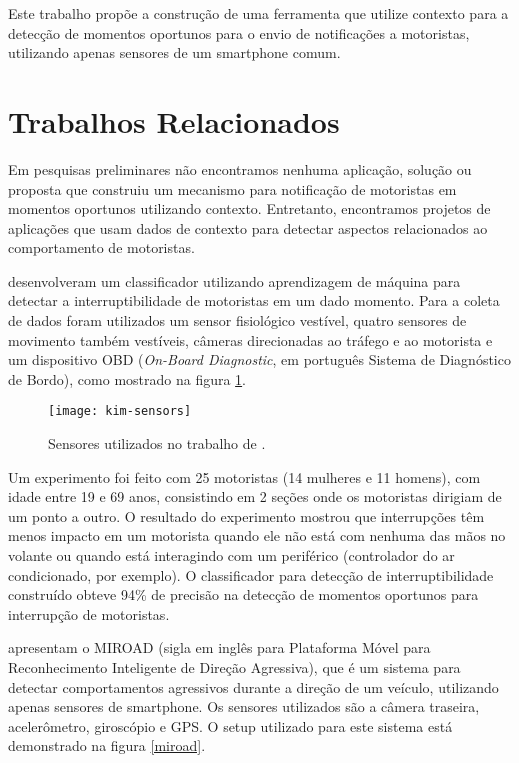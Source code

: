 Este trabalho propõe a construção de uma ferramenta que utilize contexto para a detecção de momentos oportunos para
o envio de notificações a motoristas, utilizando apenas sensores de um smartphone comum.

\section{Trabalhos Relacionados}
\label{trabalhos-relacionados}

Em pesquisas preliminares não encontramos nenhuma aplicação, solução ou proposta que construiu um mecanismo para
notificação de motoristas em momentos oportunos utilizando contexto. Entretanto, encontramos projetos de aplicações que
usam dados de contexto para detectar aspectos relacionados ao comportamento de motoristas.

 desenvolveram um classificador utilizando aprendizagem de máquina para detectar a interruptibilidade
de motoristas em um dado momento. Para a coleta de dados foram utilizados um sensor fisiológico vestível, quatro sensores
de movimento também vestíveis, câmeras direcionadas ao tráfego e ao motorista e um dispositivo OBD (\textit{On-Board Diagnostic},
em português Sistema de Diagnóstico de Bordo), como mostrado na figura \ref{kim-sensors}.

\begin{figure}[h]
\centering
\texttt{[image: kim-sensors]}
\caption{Sensores utilizados no trabalho de .}
\label{kim-sensors}
\end{figure}

Um experimento foi feito com 25 motoristas (14 mulheres e 11 homens), com idade entre 19 e 69 anos, consistindo em 2 seções
onde os motoristas dirigiam de um ponto a outro. O resultado do experimento mostrou que interrupções têm menos impacto em um motorista
quando ele não está com nenhuma das mãos no volante ou quando está interagindo com um periférico (controlador do ar condicionado, por exemplo).
O classificador para detecção de interruptibilidade construído obteve 94\% de precisão na detecção de momentos
oportunos para interrupção de motoristas.


 apresentam o MIROAD (sigla em inglês para Plataforma Móvel para Reconhecimento
Inteligente de Direção Agressiva), que é um sistema para detectar comportamentos agressivos durante a direção de um veículo, utilizando
apenas sensores de smartphone. Os sensores utilizados são a câmera traseira, acelerômetro, giroscópio e GPS. O setup utilizado para este
sistema está demonstrado na figura \ref{miroad}.

